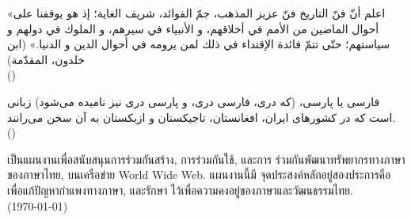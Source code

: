 \documentclass[a4paper]{article}
\begin{document}
\begin{Arabic}[]
«اعلم أنّ فنّ التاريخ فنّ عزيز المذهب، جمّ الفوائد، شريف الغاية؛ إذ هو يوقفنا على أحوال الماضين من الأمم في أخلاقهم، و الأنبياء في سيرهم، و الملوك في دولهم و سياستهم؛ حتّى تتمّ فائدة الإقتداء في ذلك لمن يرومه في أحوال الدين و الدنيا.» (ابن خلدون، المقدّمة)\\
(\Hijritoday[1])
\end{Arabic}

\begin{farsi}
فارسی یا پارسی، (که دری، فارسی دری، و پارسی دری نیز نامیده می‌شود) زبانی است که
در کشورهای ایران، افغانستان، تاجیکستان و ازبکستان به آن سخن می‌رانند. \\
(\Jalalitoday)
\end{farsi}

\begin{thai}
เป็น\wbr แผนงานเพื่อ\wbr สนับสนุน\wbr การ\wbr ร่วมกัน\wbr สร้าง, การ\wbr ร่วมกันใช้, และ\wbr การ%
ร่วมกัน\wbr พัฒนา\wbr ทรัพยากร\wbr ทาง\wbr ภาษา\wbr ของ\wbr ภาษา\wbr ไทย, บน\wbr เครือข่าย World Wide Web. แผนงานนี้\wbr มี%
จุด\wbr ประสงค์หลั\wbr กอยู่\wbr สอง\wbr ประการคือ เพื่อแก้ปัญหา\wbr กำ\wbr แพง\wbr ทาง\wbr ภาษา, และรักษา%
ไว้เพื่อ\wbr ความค\wbr งอยู่\wbr ของ\wbr ภาษา\wbr และ\wbr วัฒนธรรม\wbr ไทย. \\
(\today)
\end{thai}
\end{document}
